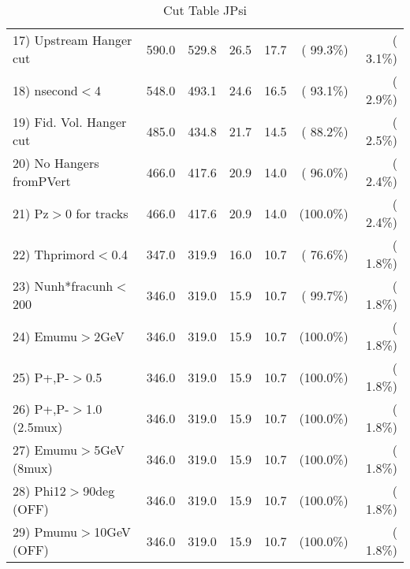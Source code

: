 \begin{table}[h!]
\begin{tabular}{||l||r|r|r|r|r|r||}
 17) Upstream Hanger cut  &        590.0 &        529.8 &         26.5 &         17.7 & ( 99.3\%) & (  3.1\%) \\
 18) nsecond$<$4          &        548.0 &        493.1 &         24.6 &         16.5 & ( 93.1\%) & (  2.9\%) \\
 19) Fid. Vol. Hanger cut &        485.0 &        434.8 &         21.7 &         14.5 & ( 88.2\%) & (  2.5\%) \\
 20) No Hangers fromPVert &        466.0 &        417.6 &         20.9 &         14.0 & ( 96.0\%) & (  2.4\%) \\
 21) Pz$>$0 for tracks    &        466.0 &        417.6 &         20.9 &         14.0 & (100.0\%) & (  2.4\%) \\
 22) Thprimord$<$0.4      &        347.0 &        319.9 &         16.0 &         10.7 & ( 76.6\%) & (  1.8\%) \\
 23) Nunh*fracunh$<$200   &        346.0 &        319.0 &         15.9 &         10.7 & ( 99.7\%) & (  1.8\%) \\
 24) Emumu$>$2GeV         &        346.0 &        319.0 &         15.9 &         10.7 & (100.0\%) & (  1.8\%) \\
 25) P+,P-$>$0.5          &        346.0 &        319.0 &         15.9 &         10.7 & (100.0\%) & (  1.8\%) \\
 26) P+,P-$>$1.0 (2.5mux) &        346.0 &        319.0 &         15.9 &         10.7 & (100.0\%) & (  1.8\%) \\
 27) Emumu$>$5GeV  (8mux) &        346.0 &        319.0 &         15.9 &         10.7 & (100.0\%) & (  1.8\%) \\
 28) Phi12$>$90deg  (OFF) &        346.0 &        319.0 &         15.9 &         10.7 & (100.0\%) & (  1.8\%) \\
 29) Pmumu$>$10GeV  (OFF) &        346.0 &        319.0 &         15.9 &         10.7 & (100.0\%) & (  1.8\%) \\
 \hline
 \hline
 \end{tabular}
 \caption{Cut Table  JPsi     }
 \label{tab-cutcohjpsi-mumu_cohrhop}
 \end{table}

